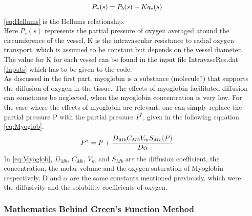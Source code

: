 \begin{equation}
\\P_v(s) = P_b(s) - Kq_v(s)
\label{eq:Hellums}
\end{equation}
\ref{eq:Hellums} is the Hellums relationship.
\\Here $P_v(s)$ represents the partial pressure of oxygen averaged around the circumference of the vessel, K is the intravascular resistance to radial oxygen transport, which is assumed to be constant but depends on the vessel diameter. The value for K for each vessel can be found in the input file IntravascRes.dat \ref{Inputs} which has to be given to the code.
%
\\As discussed in the first part, myoglobin is a substance (molecule?) that supports the diffusion of oxygen in the tissue. The effects of myoglobin-facilitated diffusion can sometimes be neglected, when the myoglobin concentration is very low. For the case where the effects of myoglobin are relevant, one can simply replace the partial pressure P with the partial pressure $P^*$, given in the following equation \ref{eq:Myoglob}.
\begin{equation}
\\P^* = P + \frac{D_{Mb}C_{Mb}V_mS_{Mb}(P)}{D \alpha}
\label{eq:Myoglob}
\end{equation}
In \ref{eq:Myoglob}, $D_{Mb}$, $C_{Mb}$, $V_m$ and $S_{Mb}$ are the diffusion coefficient, the concentration, the molar volume and the oxygen saturation of Myoglobin respectively. D and $\alpha$ are the same constants mentioned previously, which were the diffusivity and the solubility coefficients of oxygen.

\subsubsection*{Mathematics Behind Green's Function Method}

